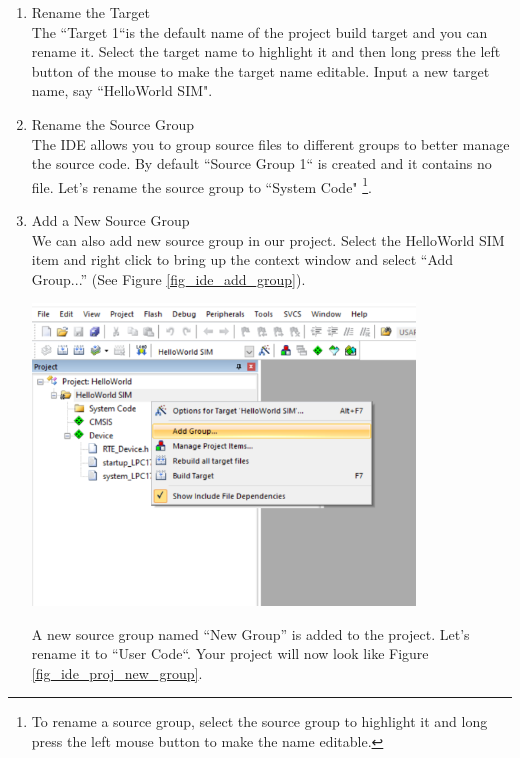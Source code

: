 \begin{enumerate}
  \item{Rename the Target}\\ 
    The ``Target 1``is the default name of the project build target and you can rename it.
    Select the target name to highlight it and then long press the left button of
    the mouse to make the target name editable.
    Input a new target name, say ``HelloWorld SIM".   

  \item{Rename the Source Group} \\
    The IDE allows you to group source files to different groups to better manage the source code.
    By default ``Source Group 1`` is created and it contains no file.
    Let's rename the source group to ``System Code"
    \footnote{To rename a source group, select the source group to highlight it and long press the left mouse button to make the name editable.}. 

  \item{Add a New Source Group} \\
  We can also add new source group in our project.
  Select the HelloWorld SIM item and right click to bring up the context window and
  select ``Add Group...'' (See Figure \ref{fig_ide_add_group}).\par 

    \begin{minipage}{\linewidth}
      \centering
      \includegraphics[width=4in]{figure/uv5/IDE_add_group}
      \label{fig_ide_add_group}
    \end{minipage}

    A new source group named ``New Group'' is added to the project.
    Let's rename it to ``User Code``. 
    Your project will now look like Figure \ref{fig_ide_proj_new_group}. \par


\end{enumerate}
